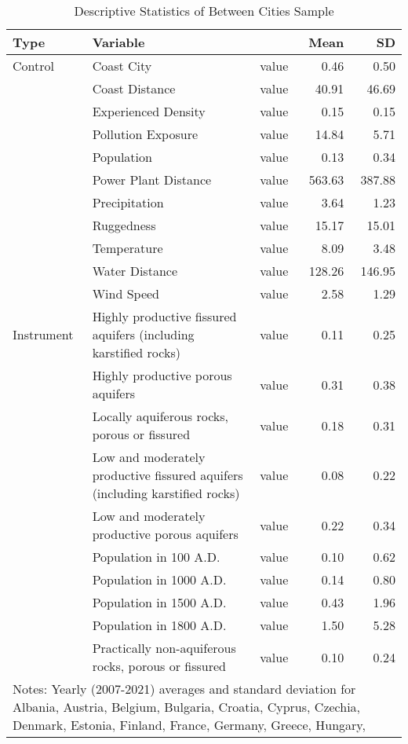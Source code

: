 \begin{table}

\caption{Descriptive Statistics of Between Cities Sample}
\centering
\begin{tabular}[t]{lllrr}
\toprule
Type & Variable &   & Mean & SD\\
\midrule
Control & Coast City & value & \num{0.46} & \num{0.50}\\
 & Coast Distance & value & \num{40.91} & \num{46.69}\\
 & Experienced Density & value & \num{0.15} & \num{0.15}\\
 & Pollution Exposure & value & \num{14.84} & \num{5.71}\\
 & Population & value & \num{0.13} & \num{0.34}\\
 & Power Plant Distance & value & \num{563.63} & \num{387.88}\\
 & Precipitation & value & \num{3.64} & \num{1.23}\\
 & Ruggedness & value & \num{15.17} & \num{15.01}\\
 & Temperature & value & \num{8.09} & \num{3.48}\\
 & Water Distance & value & \num{128.26} & \num{146.95}\\
 & Wind Speed & value & \num{2.58} & \num{1.29}\\
Instrument & Highly productive fissured aquifers (including karstified rocks) & value & \num{0.11} & \num{0.25}\\
 & Highly productive porous aquifers & value & \num{0.31} & \num{0.38}\\
 & Locally aquiferous rocks, porous or fissured & value & \num{0.18} & \num{0.31}\\
 & Low and moderately productive fissured aquifers (including karstified rocks) & value & \num{0.08} & \num{0.22}\\
 & Low and moderately productive porous aquifers & value & \num{0.22} & \num{0.34}\\
 & Population in 100 A.D. & value & \num{0.10} & \num{0.62}\\
 & Population in 1000 A.D. & value & \num{0.14} & \num{0.80}\\
 & Population in 1500 A.D. & value & \num{0.43} & \num{1.96}\\
 & Population in 1800 A.D. & value & \num{1.50} & \num{5.28}\\
 & Practically non-aquiferous rocks, porous or fissured & value & \num{0.10} & \num{0.24}\\
\bottomrule
\multicolumn{5}{l}{\rule{0pt}{1em}Notes: Yearly (2007-2021) averages and standard deviation for Albania, Austria, Belgium, Bulgaria, Croatia, Cyprus, Czechia, Denmark, Estonia, Finland, France, Germany, Greece, Hungary,
}
\end{tabular}
\end{table}
